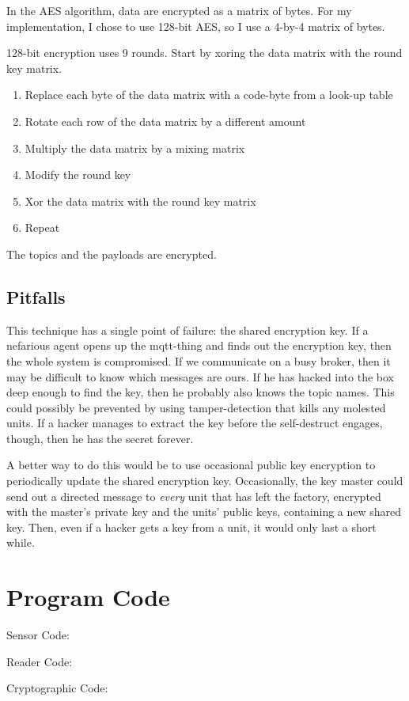 \documentclass[final,titlepage,onecolumn]{article}
\begin{document}
In the AES algorithm, data are encrypted as a matrix of bytes. For my implementation, I chose to use 128-bit AES, so I use a 4-by-4 matrix of bytes. 

128-bit encryption uses 9 rounds. Start by xoring the data matrix with the round key matrix.

\begin{enumerate}
	\item Replace each byte of the data matrix with a code-byte from a look-up table
	\item Rotate each row of the data matrix by a different amount
	\item Multiply the data matrix by a mixing matrix
	\item Modify the round key
	\item Xor the data matrix with the round key matrix
	\item Repeat
\end{enumerate}

The topics and the payloads are encrypted.

\subsection{Pitfalls}

This technique has a single point of failure: the shared encryption key. If a nefarious agent opens up the mqtt-thing and finds out the encryption key, then the whole system is compromised. If we communicate on a busy broker, then it may be difficult to know which messages are ours. If he has hacked into the box deep enough to find the key, then he probably also knows the topic names. This could possibly be prevented by using tamper-detection that kills any molested units. If a hacker manages to extract the key before the self-destruct engages, though, then he has the secret forever.

A better way to do this would be to use occasional public key encryption to periodically update the shared encryption key. Occasionally, the key master could send out a directed message to \emph{every} unit that has left the factory, encrypted with the master's private key and the units' public keys, containing a new shared key. Then, even if a hacker gets a key from a unit, it would only last a short while.

\newpage
\appendix
\section{Program Code}

Sensor Code:
\lstset{style=Cpp}


Reader Code:
\lstset{style=Cpp}


Cryptographic Code:
\lstset{style=Cpp}

\end{document}

